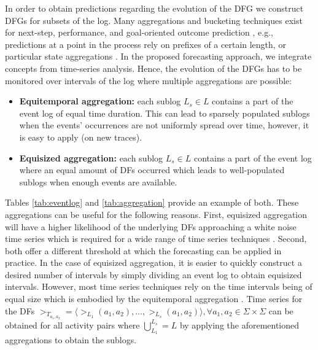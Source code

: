In order to obtain predictions regarding the evolution of the DFG we construct DFGs for subsets of the log.
Many aggregations and bucketing techniques exist for next-step, performance, and goal-oriented outcome prediction \cite{DBLP:conf/caise/TaxVRD17,DBLP:journals/tkdd/TeinemaaDRM19,nguyen2016business}, e.g., predictions at a point in the process rely on prefixes of a certain length, or particular state aggregations \cite{DBLP:journals/sosym/AalstRVDKG10}.
In the proposed forecasting approach, we integrate concepts from time-series analysis.
Hence, the evolution of the DFGs has to be monitored over intervals of the log where multiple aggregations are possible:
\begin{itemize}
	\item \textbf{Equitemporal aggregation:} each sublog $L_s\in L$ contains a part of the event log of equal time duration. This can lead to sparsely populated sublogs when the events' occurrences are not uniformly spread over time, however, it is easy to apply (on new traces).
	\item \textbf{Equisized aggregation:} each sublog $L_s\in L$ contains a part of the event log where an equal amount of DFs occurred which leads to well-populated sublogs when enough events are available.
\end{itemize}
Tables \ref{tab:eventlog} and \ref{tab:aggregation} provide an example of both.
These aggregations can be useful for the following reasons.
First, equisized aggregation will have a higher likelihood of the underlying DFs approaching a white noise time series which is required for a wide range of time series techniques \cite{hyndman2018forecasting}. 
Second, both offer a different threshold at which the forecasting can be applied in practice.
In the case of equisized aggregation, it is easier to quickly construct a desired number of intervals by simply dividing an event log to obtain equisized intervals.
However, most time series techniques rely on the time intervals being of equal size which is embodied by the equitemporal aggregation \cite{kil1997optimum}.
Time series for the DFs $>_{T_{a_1,a_2}}=\langle >_{L_1}(a_1,a_2),\dots,>_{L_s}(a_1,a_2)\rangle, \forall a_1,a_2\in \Sigma\times\Sigma$ can be obtained for all activity pairs where $\bigcup^{L_s}_{L_1}=L$ by applying the aforementioned aggregations to obtain the sublogs.
